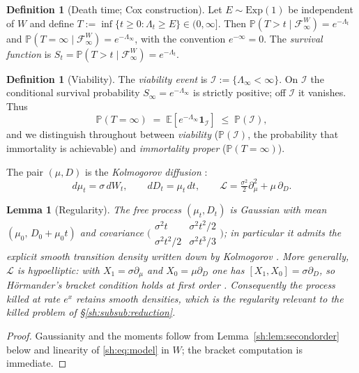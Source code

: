 \documentclass[11pt]{article}
\numberwithin{equation}{section}
\theoremstyle{plain}
\newtheorem{lemma}[theorem]{Lemma}
\theoremstyle{definition}
\newtheorem{definition}[theorem]{Definition}
\theoremstyle{remark}
\newcommand{\E}{\mathbb{E}}
\newcommand{\PP}{\mathbb{P}}
\newcommand{\one}{\mathbf{1}}
\newcommand{\Imm}{\mathcal{I}}
\newcommand{\Fc}{\mathcal{F}}
\newcommand{\Lc}{\mathcal{L}}
\begin{document}
\begin{definition}[Death time; Cox construction]\label{sh:def:cox}
Let $E\sim\mathrm{Exp}(1)$ be independent of $W$ and define
$T:=\inf\{t\ge0:\Lambda_t\ge E\}\in(0,\infty]$. Then
$\PP(T>t\mid\Fc^W_\infty)=e^{-\Lambda_t}$ and
$\PP(T=\infty\mid\Fc^W_\infty)=e^{-\Lambda_\infty}$, with the convention
$e^{-\infty}=0$. The \emph{survival function} is
$S_t=\PP(T>t\mid\Fc^W_\infty)=e^{-\Lambda_t}$.
\end{definition}

\begin{definition}[Viability]\label{sh:def:viab}
The \emph{viability event} is $\Imm:=\{\Lambda_\infty<\infty\}$. On $\Imm$
the conditional survival probability $S_\infty=e^{-\Lambda_\infty}$ is
strictly positive; off $\Imm$ it vanishes. Thus
\begin{equation}\label{sh:eq:twotier}
\PP(T=\infty)\;=\;\E\!\left[e^{-\Lambda_\infty}\one_\Imm\right]
\;\le\;\PP(\Imm),
\end{equation}
and we distinguish throughout between \emph{viability} ($\PP(\Imm)$, the
probability that immortality is achievable) and \emph{immortality proper}
($\PP(T=\infty)$).
\end{definition}

The pair $(\mu,D)$ is the \emph{Kolmogorov diffusion} \cite{Kol34}:
\begin{equation}\label{sh:eq:kolm}
d\mu_t=\sigma\,dW_t,\qquad dD_t=\mu_t\,dt,\qquad
\Lc=\tfrac{\sigma^2}{2}\partial_\mu^2+\mu\,\partial_D .
\end{equation}

\begin{lemma}[Regularity]\label{sh:lem:hypo}
The free process $(\mu_t,D_t)$ is Gaussian with mean
$(\mu_0,\,D_0+\mu_0t)$ and covariance
$\bigl(\begin{smallmatrix}\sigma^2t&\sigma^2t^2/2\\
\sigma^2t^2/2&\sigma^2t^3/3\end{smallmatrix}\bigr)$;
in particular it admits the explicit smooth transition density written down
by Kolmogorov \cite{Kol34}. More generally, $\Lc$ is hypoelliptic: with
$X_1=\sigma\partial_\mu$ and $X_0=\mu\partial_D$ one has
$[X_1,X_0]=\sigma\partial_D$, so H\"ormander's bracket condition holds at
first order \cite{Hor67}. Consequently the process killed at rate $e^{x}$
retains smooth densities, which is the regularity relevant to the killed
problem of \S\ref{sh:subsub:reduction}.
\end{lemma}

\begin{proof}
Gaussianity and the moments follow from
Lemma~\ref{sh:lem:secondorder} below and linearity of
\eqref{sh:eq:model} in $W$; the bracket computation is immediate.
\end{proof}
\end{document}
